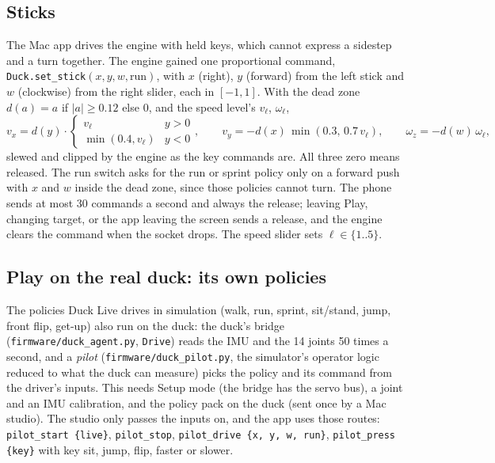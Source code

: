 \documentclass[11pt]{article}
\begin{document}
\subsection{Sticks}\label{sec:sticks}
The Mac app drives the engine with held keys, which cannot express a sidestep and a turn together. The engine
gained one proportional command, \texttt{Duck.set\_stick}$(x, y, w, \text{run})$, with $x$ (right), $y$ (forward)
from the left stick and $w$ (clockwise) from the right slider, each in $[-1, 1]$. With the dead zone
$d(a) = a$ if $|a| \ge 0.12$ else $0$, and the speed level's $v_\ell$, $\omega_\ell$,
\begin{equation}\label{eq:stick}
v_x = d(y)\cdot\begin{cases} v_\ell & y > 0\\ \min(0.4, v_\ell) & y < 0\end{cases},\qquad
v_y = -d(x)\,\min(0.3,\, 0.7\,v_\ell),\qquad
\omega_z = -d(w)\,\omega_\ell ,
\end{equation}
slewed and clipped by the engine as the key commands are. All three zero means released. The run switch asks for
the run or sprint policy only on a forward push with $x$ and $w$ inside the dead zone, since those policies cannot
turn. The phone sends at most 30 commands a second and always the release; leaving Play, changing target, or the
app leaving the screen sends a release, and the engine clears the command when the socket drops. The speed slider
sets $\ell \in \{1..5\}$.

\subsection{Play on the real duck: its own policies}\label{sec:pilot}
The policies Duck Live drives in simulation (walk, run, sprint, sit/stand, jump, front flip, get-up) also run on
the duck: the duck's bridge (\texttt{firmware/duck\_agent.py}, \texttt{Drive}) reads the IMU and the 14 joints 50
times a second, and a \emph{pilot} (\texttt{firmware/duck\_pilot.py}, the simulator's operator logic reduced to
what the duck can measure) picks the policy and its command from the driver's inputs. This needs Setup mode (the
bridge has the servo bus), a joint and an IMU calibration, and the policy pack on the duck (sent once by a Mac
studio). The studio only passes the inputs on, and the app uses those routes: \texttt{pilot\_start \{live\}},
\texttt{pilot\_stop}, \texttt{pilot\_drive \{x, y, w, run\}}, \texttt{pilot\_press \{key\}} with key sit, jump,
flip, faster or slower.
\end{document}
